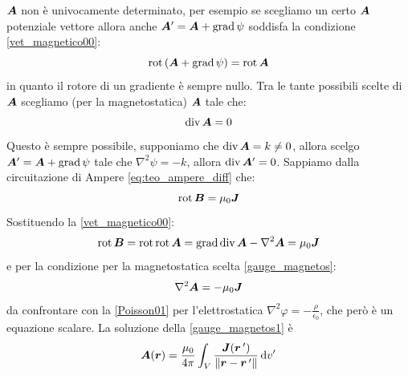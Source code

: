 $\boldsymbol{A}$ non è univocamente determinato, per esempio se scegliamo un certo $\boldsymbol{A}$ potenziale vettore allora anche $\boldsymbol{A}'=\boldsymbol{A}+\operatorname{grad}\psi$ soddisfa la condizione \eqref{vet_magnetico00}:
\[
  \operatorname{rot}\left(\boldsymbol{A}+\operatorname{grad}\psi\right)=\operatorname{rot}\boldsymbol{A}
\]
in quanto il rotore di un gradiente è sempre nullo. Tra le tante possibili scelte di $\boldsymbol{A}$ scegliamo (per la magnetostatica) $\boldsymbol{A}$ tale che:
\begin{equation}
  \operatorname{div}\boldsymbol{A}=0
  \label{gauge_magnetos}
\end{equation}
Questo è sempre possibile, supponiamo che $\operatorname{div}\boldsymbol{A}=k\neq 0$, allora scelgo $\boldsymbol{A}'=\boldsymbol{A} +\operatorname{grad}\psi$ tale che $\nabla^2\psi = -k$, allora $\operatorname{div} \boldsymbol{A}'=0$. Sappiamo dalla circuitazione di Ampere \eqref{eq:teo_ampere_diff} che:
\begin{equation}
  \operatorname{rot}\boldsymbol{B}=\mu_0\boldsymbol{J}
\end{equation}
Sostituendo la \eqref{vet_magnetico00}:
\begin{equation}
  \operatorname{rot}\boldsymbol{B}=\operatorname{rot}\operatorname{rot}\boldsymbol{A}=\operatorname{grad}\operatorname{div}\boldsymbol{A}-\nabla^2\boldsymbol{A}=\mu_0\boldsymbol{J}
\end{equation}
e per la condizione per la magnetostatica scelta \eqref{gauge_magnetos}:
\begin{equation}
  \nabla^2\boldsymbol{A}=-\mu_0\boldsymbol{J}
  \label{gauge_magnetos1}
\end{equation}
da confrontare con la \eqref{Poisson01} per l'elettrostatica $\nabla^2\varphi = -\frac{\rho}{\epsilon_0}$, che però è un equazione scalare. La soluzione della \eqref{gauge_magnetos1} è
\begin{equation}
  \boldsymbol{A}(\boldsymbol{r})=\frac{\mu_0}{4\pi}\int_V\frac{\boldsymbol{J}(\boldsymbol{r}\,')}{\left\lVert\boldsymbol{r}-\boldsymbol{r}\,'\right\rVert}\,\mathrm{d} v'
  \label{vet_magnetico01}
\end{equation}
